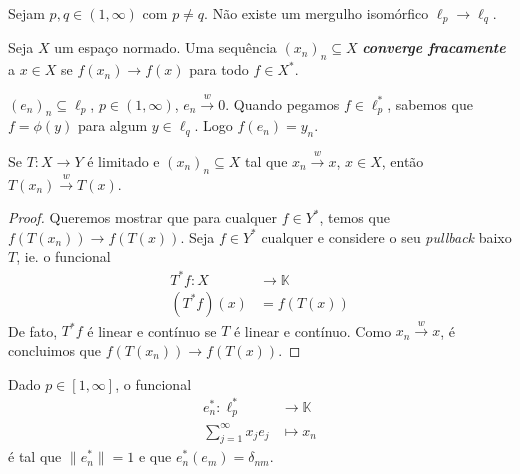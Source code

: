 \documentclass[portuguese]{article}
\theoremstyle{definition}
\begin{document}
	\begin{teo}[Pitt]
		Sejam $p,q\in(1,\infty)$ com $p\neq q$. Não existe um mergulho isomórfico $\ell_p\to\ell_q$.
	\end{teo}
	\begin{defn}
		Seja $X$ um espaço normado. Uma sequência $(x_n)_n\subseteq X$ \textbf{\textit{converge fracamente}} a $x\in X$ se $f(x_n)\to f(x)$ para todo $f\in X^*$.
	\end{defn}
	\begin{exemplo}
		$(e_n)_n\subseteq\ell_p$, $p\in(1,\infty)$, $e_n\overset{w}{\longrightarrow}0$. Quando pegamos $f\in\ell^*_p$, sabemos que $f=\phi(y)$ para algum $y\in\ell_q$. Logo $f(e_n)=y_n$.
	\end{exemplo}
	\begin{obs}
		Se $T:X\to Y$ é limitado e $(x_n)_n\subseteq X$ tal que $x_n\overset{w}{\to}x$, $x\in X$, então $T(x_n)\overset{w}{\to}T(x)$.
	\end{obs}
	{\color{blue-violet}\begin{proof}
			Queremos mostrar que para cualquer $f\in Y^*$, temos que $f(T(x_n))\to f(T(x))$. Seja $f\in Y^*$ cualquer e considere o seu \textit{pullback} baixo $T$, ie. o funcional
			\begin{align*}
				T^*f:X&\to\mathbb{K}\\
				(T^*f)(x)&=f(T(x))
			\end{align*}
			De fato, $T^*f$ é linear e contínuo se $T$ é linear e contínuo. Como $x_n\overset{w}{\longrightarrow}x$, é concluimos que $f(T(x_n))\to f(T(x))$.
	\end{proof}}
	\begin{defn}
		Dado $p\in[1,\infty]$, o funcional
		\begin{align*}
			e_n^*:\ell_p^*&\to\mathbb{K}\\
			\sum_{j=1}^\infty x_je_j&\mapsto x_n
		\end{align*}
		é tal que $\| e^*_n\|=1$ e que $e^*_n(e_m)=\delta_{nm}$.
	\end{defn}
\end{document}
